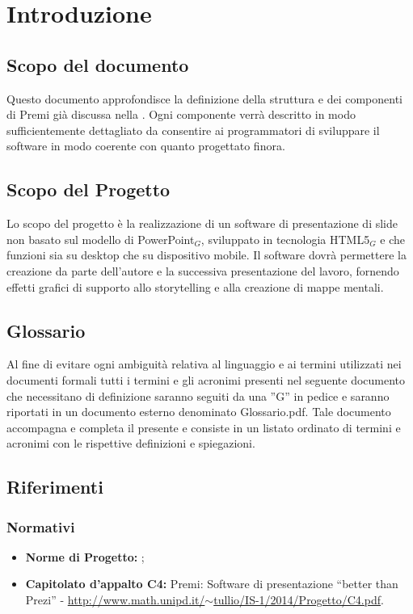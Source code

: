\section{Introduzione}
\subsection{Scopo del documento}
Questo documento approfondisce la definizione della struttura e dei componenti di Premi già discussa nella \ST{}. Ogni componente verrà descritto in modo sufficientemente dettagliato da consentire ai programmatori di sviluppare il software in modo coerente con
 quanto progettato finora.

\subsection{Scopo del Progetto}
Lo scopo del progetto è la realizzazione di un software di presentazione di slide non basato sul modello di PowerPoint$_{G}$, sviluppato in tecnologia HTML5$_{G}$ e che funzioni sia su desktop che su dispositivo mobile. Il software dovrà permettere la creazione da parte dell'autore e la successiva presentazione del lavoro, fornendo effetti grafici di supporto allo storytelling e alla creazione di mappe mentali. 

\subsection{Glossario}
Al fine di evitare ogni ambiguità relativa al linguaggio e ai termini utilizzati nei documenti formali tutti i termini e gli acronimi presenti nel seguente documento che necessitano di definizione saranno seguiti da una ”G” in pedice e saranno riportati in un documento esterno denominato Glossario.pdf. Tale documento accompagna e completa il presente e consiste in un listato ordinato di termini e acronimi con le rispettive definizioni e spiegazioni.

\subsection{Riferimenti}
\subsubsection{Normativi}
\begin{itemize}
	\item \textbf{Norme di Progetto:} \textit{\NdP};
	\item \textbf{Capitolato d'appalto C4:} Premi: Software di presentazione ``better than Prezi'' - \href{http://www.math.unipd.it/~tullio/IS-1/2014/Progetto/C4.pdf}{http://www.math.unipd.it/$\sim$tullio/IS-1/2014/Progetto/C4.pdf}.
\end{itemize}
